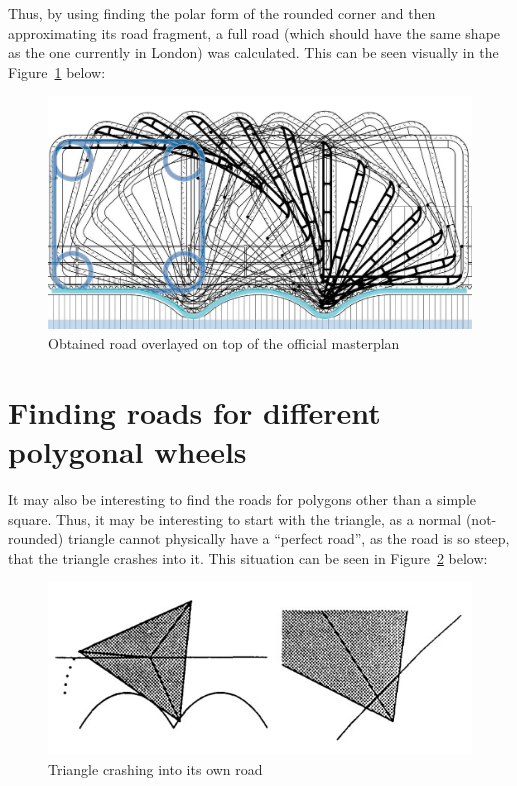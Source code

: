 \documentclass[12pt]{article}
\begin{document}
        Thus, by using finding the polar form of the rounded corner and then approximating its road fragment, a full road (which should have the same shape as the one currently in London) was calculated. This can be seen visually in the Figure~\ref{fig:masterplan_overlayed} below:

        \begin{figure}[H]
            \centering
            \includegraphics[width=0.8\linewidth]{images/masterplan_overlayed.png}
            \caption[Obtained road overlayed on top of the official masterplan]{Obtained road overlayed on top of the official masterplan\footnotemark}\label{fig:masterplan_overlayed}
        \end{figure}

    \section{Finding roads for different polygonal wheels}

        It may also be interesting to find the roads for polygons other than a simple square. Thus, it may be interesting to start with the triangle, as a normal (not-rounded) triangle cannot physically have a ``perfect road'', as the road is so steep, that the triangle crashes into it. This situation can be seen in Figure~\ref{fig:triangle_crash} below:

        \begin{figure}[H]
            \centering
            \includegraphics[width=0.7\linewidth]{images/triangle_wheel.jpg}
            \caption{Triangle crashing into its own road~\cite{Hall_Wagon_1992}}\label{fig:triangle_crash}
        \end{figure}
\end{document}
